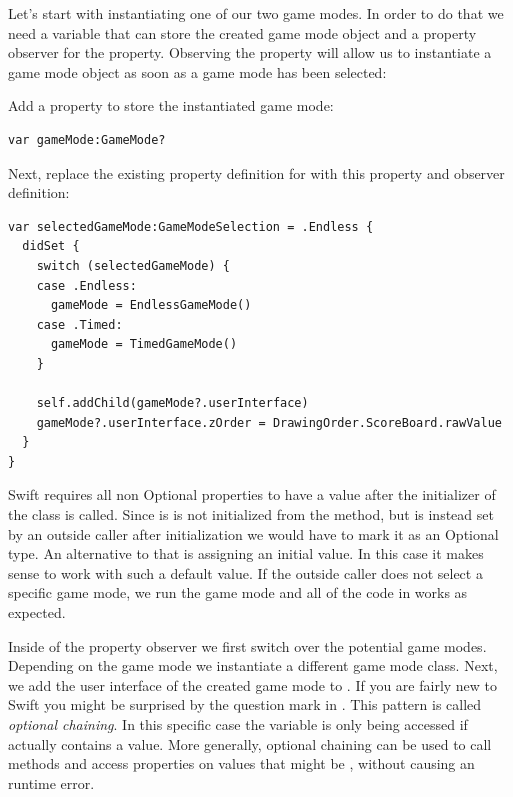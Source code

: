 Let's start with instantiating one of our two game modes. In order to do that we
need a variable that can store the created game mode object and a property
observer for the  property. Observing the  property
will allow us to instantiate a game mode object as soon as a game mode has been
selected:
\begin{leftbar}
Add a property to store the instantiated game mode:
\begin{lstlisting}
var gameMode:GameMode?
\end{lstlisting}
Next, replace the existing property definition for
 with this property and observer definition:
\begin{lstlisting}
var selectedGameMode:GameModeSelection = .Endless {
  didSet {
    switch (selectedGameMode) {
    case .Endless:
      gameMode = EndlessGameMode()
    case .Timed:
      gameMode = TimedGameMode()
    }
    
    self.addChild(gameMode?.userInterface)
    gameMode?.userInterface.zOrder = DrawingOrder.ScoreBoard.rawValue
  }
}
\end{lstlisting}
\end{leftbar}
Swift requires all non Optional properties to have a value after the
initializer of the class is called. Since  is is not
initialized from the  method, but is instead set by an outside caller after
 initialization we would have to mark it as an Optional type. An alternative to
 that is assigning an initial value. In this case it makes sense to work with
 such a default value. If the outside caller does not select a specific game
 mode, we run the  game mode and all of the code in
  works as expected.

Inside of the property observer we first switch over the potential game modes.
Depending on the game mode we instantiate a different game mode class. Next, we
add the user interface of the created game mode to . If
you are fairly new to Swift you might be surprised by the question mark in
. This pattern is called
\textit{optional chaining}. In this specific case the 
variable is only being accessed if  actually
contains a value. More generally, optional chaining can be used to call methods
and access properties on values that might be , without causing an
runtime error.

